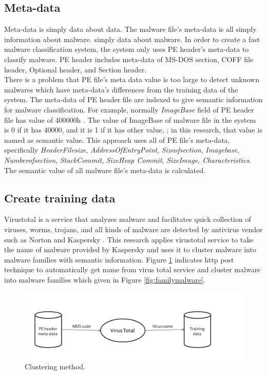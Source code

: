 \subsection{Meta-data}
Meta-data is simply data about data. The malware file's meta-data is all simply information about malware. simply data about malware.  
In order to create a fast malware classification system, the system only uses PE header's meta-data to classify malware. PE header includes meta-data of MS-DOS section, COFF file header, Optional header, and Section header.\\
There is a problem that PE file's meta data value is too large to detect unknown malwares which have meta-data's differences from the training data of the system. The meta-data of PE header file are indexed to give semantic information for malware classification. For example, normally \emph{ImageBase} field of PE header file has value of 400000h \cite{goppit}. The value of ImageBase of malware file in the system is 0 if it has 40000, and it is 1 if it has other value, ; in this research, that value is named as semantic value. This approach uses all of PE file's meta-data, specifically \emph{HeaderFilesize}, \emph{AddressOfEntryPoint}, \emph{Sizeofsection}, \emph{Imagebase}, \emph{Numberofsection}, \emph{StackCommit}, \emph{SizeHeap Commit}, \emph{SizeImage}, \emph{Characteristics}. The semantic value of all malware file's meta-data is calculated.

\subsection{Create training data}
Virustotal is a service that analyzes malware and facilitates quick collection of viruses, worms, trojans, and all kinds of malware are detected by antivirus vendor such as Norton and Kaspersky \cite{virustotal}. This research applies virustotal service to take the name of malware provided by Kaspersky and uses it to cluster malware into malware families with semantic information. 
Figure \ref{fig:clustering} indicates http post technique to automatically get name from virus total service and cluster malware into malware families which given in Figure \ref{fig:familymalware}.
\begin{figure}[h!]
\centering
\includegraphics[width=1\textwidth]{graph/clustering.jpg}
\caption{Clustering method.}
\label{fig:clustering}
\end{figure}
\newline
